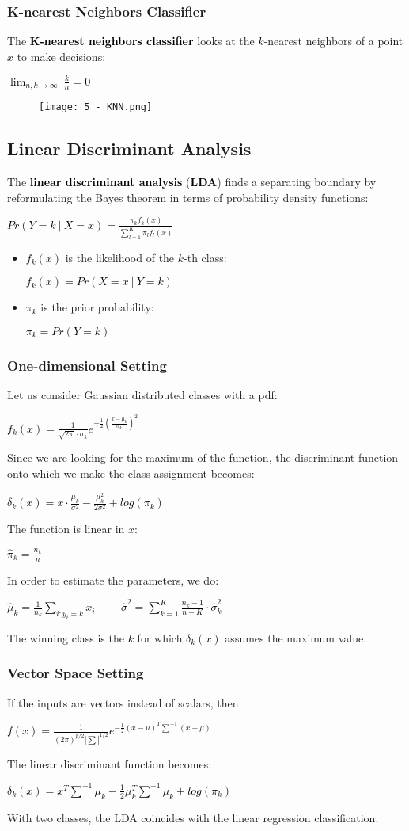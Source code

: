 \documentclass{article}
\newcommand{\bb}[1]{\textcolor{black}{\textbf{#1}}}
\newcommand{\rr}[1]{\textcolor{black}{#1}}
\newcommand{\cc}[1]{\begin{center}\textcolor{black}{#1}\end{center}}
\begin{document}
\subsubsection{K-nearest Neighbors Classifier}
The \bb{K-nearest neighbors classifier} looks at the \rr{$k$}-nearest neighbors of a point \rr{$x$} to make decisions:
\cc{$\displaystyle\lim_{n,k\rightarrow\infty}\ \displaystyle\frac{k}{n}=0$}
\begin{figure}[H]
    \centering
    \texttt{[image: 5 - KNN.png]}
\end{figure}

\subsection{Linear Discriminant Analysis}
The \bb{linear discriminant analysis} (\bb{LDA}) finds a separating boundary by reformulating the Bayes theorem in terms of probability density functions:
\cc{$Pr(Y = k\ | \ X=x)=\displaystyle\frac{\pi_kf_k(x)}{\sum^K_{l=1}\pi_lf_l(x)}$}
\begin{itemize}
    \item \rr{$f_k(x)$} is the likelihood of the \rr{$k$}-th class:
        \cc{$f_k(x)=Pr(X=x\ |\ Y=k)$}
    \item \rr{$\pi_k$} is the prior probability:
        \cc{$\pi_k=Pr(Y=k)$}
\end{itemize}
\subsubsection{One-dimensional Setting}
Let us consider Gaussian distributed classes with a pdf:
\cc{$f_k(x) = \displaystyle\frac{1}{\sqrt{2\pi}\cdot\sigma_k}e^{-\displaystyle\frac{1}{2}(\displaystyle\frac{x-\mu_k}{\sigma_k})^2}$}
Since we are looking for the maximum of the function, the discriminant function onto which we make the class assignment becomes:
\cc{$\delta_k(x)=x\cdot\displaystyle\frac{\mu_k}{\sigma^2}-\displaystyle\frac{\mu^2_k}{2\sigma^2}+log(\pi_k)$}
The function is linear in \rr{$x$}:
\cc{$\hat{\pi}_k=\displaystyle\frac{n_k}{n}$}
In order to estimate the parameters, we do:
\cc{$\hat{\mu}_k=\displaystyle\frac{1}{n_k}\displaystyle\sum_{i:y_i=k}x_i$ \ \ \ \ 
    $\hat{\sigma}^2=\displaystyle\sum^K_{k=1}\displaystyle\frac{n_k-1}{n-K}\cdot\hat{\sigma}^2_k$}
The winning class is the \rr{$k$} for which \rr{$\delta_k(x)$} assumes the maximum value.
\subsubsection{Vector Space Setting}
If the inputs are vectors instead of scalars, then:
\cc{$f(x)=\displaystyle\frac{1}{(2\pi)^{p/2}|\sum|^{1/2}}e^{-\frac{1}{2}(x-\mu)^T\sum^{-1}(x-\mu)}$}
The linear discriminant function becomes:
\cc{$\delta_k(x)=x^T\sum^{-1}\mu_k-\displaystyle\frac{1}{2}\mu_k^T\sum^{-1}\mu_k+log(\pi_k)$}
With two classes, the LDA coincides with the linear regression classification.
\end{document}
